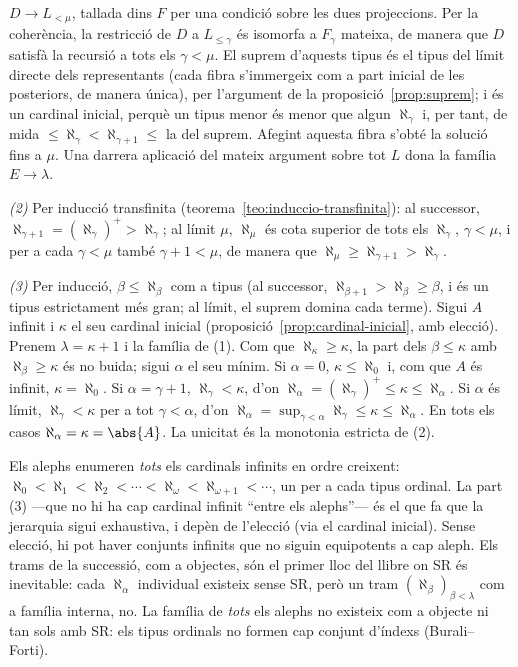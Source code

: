 \begin{prova}
\(D\to L_{<\mu}\), tallada dins \(F\) per una condició sobre les dues
projeccions. Per la coherència, la restricció de \(D\) a \(L_{\le\gamma}\) és
isomorfa a \(F_\gamma\) mateixa, de manera que \(D\) satisfà la recursió a
tots els \(\gamma<\mu\). El suprem d'aquests tipus és el
tipus del límit directe dels representants (cada fibra s'immergeix com a
part inicial de les posteriors, de manera única), per l'argument de la
proposició~\ref{prop:suprem}; i és un cardinal inicial, perquè un tipus
menor és menor que algun \(\aleph_\gamma\) i, per tant, de mida
\(\le\aleph_\gamma<\aleph_{\gamma+1}\le\) la del suprem. Afegint aquesta
fibra s'obté la solució fins a \(\mu\). Una darrera aplicació del mateix
argument sobre tot \(L\) dona la família \(E\to\lambda\).

\emph{(2)} Per inducció transfinita (teorema~\ref{teo:induccio-transfinita}):
al successor, \(\aleph_{\gamma+1}=(\aleph_\gamma)^{+}>\aleph_\gamma\); al
límit \(\mu\), \(\aleph_\mu\) és cota superior de tots els \(\aleph_\gamma\),
\(\gamma<\mu\), i per a cada \(\gamma<\mu\) també \(\gamma+1<\mu\), de manera
que \(\aleph_\mu\ge\aleph_{\gamma+1}>\aleph_\gamma\).

\emph{(3)} Per inducció, \(\beta\le\aleph_\beta\) com a tipus (al successor,
\(\aleph_{\beta+1}>\aleph_\beta\ge\beta\), i és un tipus estrictament més gran;
al límit, el suprem domina cada terme). Sigui \(A\) infinit i \(\kappa\) el
seu cardinal inicial (proposició~\ref{prop:cardinal-inicial}, amb elecció).
Prenem \(\lambda=\kappa+1\) i la família de (1). Com que
\(\aleph_\kappa\ge\kappa\), la part dels \(\beta\le\kappa\) amb
\(\aleph_\beta\ge\kappa\) és no buida; sigui \(\alpha\) el seu mínim. Si
\(\alpha=0\), \(\kappa\le\aleph_0\) i, com que \(A\) és infinit,
\(\kappa=\aleph_0\). Si \(\alpha=\gamma+1\), \(\aleph_\gamma<\kappa\), d'on
\(\aleph_\alpha=(\aleph_\gamma)^{+}\le\kappa\le\aleph_\alpha\). Si \(\alpha\)
és límit, \(\aleph_\gamma<\kappa\) per a tot \(\gamma<\alpha\), d'on
\(\aleph_\alpha=\sup_{\gamma<\alpha}\aleph_\gamma\le\kappa\le\aleph_\alpha\). En
tots els casos \(\aleph_\alpha=\kappa=\abs{A}\). La unicitat és la
monotonia estricta de (2).
\end{prova}

\begin{observacio}\label{obs:alephs-classica}
Els alephs enumeren \emph{tots} els cardinals infinits en ordre creixent:
\(\aleph_0<\aleph_1<\aleph_2<\cdots<\aleph_\omega<\aleph_{\omega+1}<\cdots\),
un per a cada tipus ordinal. La part (3) ---que no hi ha cap cardinal infinit
\enquote{entre els alephs}--- és el que fa que la jerarquia sigui exhaustiva, i
depèn de l'elecció (via el cardinal inicial). Sense elecció, hi pot haver
conjunts infinits que no siguin equipotents a cap aleph. Els trams de la
successió, com a objectes, són el primer lloc del llibre on SR és
inevitable: cada \(\aleph_\alpha\) individual existeix sense SR, però un tram
\((\aleph_\beta)_{\beta<\lambda}\) com a família interna, no. La família de
\emph{tots} els alephs no existeix com a objecte ni tan sols amb SR: els
tipus ordinals no formen cap conjunt d'índexs (Burali--Forti).
\end{observacio}

